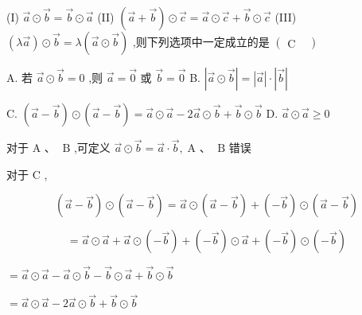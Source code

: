 \documentclass[10pt]{article}
\begin{document}
(I) \(\overrightarrow{a} \odot  \overrightarrow{b} = \overrightarrow{b} \odot  \overrightarrow{a}\) (II) \(\left( {\overrightarrow{a} + \overrightarrow{b}}\right)  \odot  \overrightarrow{c} = \overrightarrow{a} \odot  \overrightarrow{c} + \overrightarrow{b} \odot  \overrightarrow{c}\) (III) \(\left( {\lambda \overrightarrow{a}}\right)  \odot  \overrightarrow{b} = \lambda \left( {\overrightarrow{a} \odot  \overrightarrow{b}}\right)\) ,则下列选项中一定成立的是 \(\left( \begin{array}{ll} \mathrm{C} &  \end{array}\right)\)

A. 若 \(\overrightarrow{a} \odot  \overrightarrow{b} = 0\) ,则 \(\overrightarrow{a} = \overrightarrow{0}\) 或 \(\overrightarrow{b} = \overrightarrow{0}\) B. \(\left| {\overrightarrow{a} \odot  \overrightarrow{b}}\right|  = \left| \overrightarrow{a}\right|  \cdot  \left| \overrightarrow{b}\right|\)

C. \(\left( {\overrightarrow{a} - \overrightarrow{b}}\right)  \odot  \left( {\overrightarrow{a} - \overrightarrow{b}}\right)  = \overrightarrow{a} \odot  \overrightarrow{a} - 2\overrightarrow{a} \odot  \overrightarrow{b} + \overrightarrow{b} \odot  \overrightarrow{b}\) D. \(\overrightarrow{a} \odot  \overrightarrow{a} \geq  0\)

对于 \(\mathrm{A}\text{ 、 }\mathrm{\;B}\) ,可定义 \(\overrightarrow{a} \odot  \overrightarrow{b} = \overrightarrow{a} \cdot  \overrightarrow{b},\mathrm{\;A}\text{ 、 }\mathrm{\;B}\) 错误

对于 \(\mathrm{C}\) ,

\[
\left( {\overrightarrow{a} - \overrightarrow{b}}\right)  \odot  \left( {\overrightarrow{a} - \overrightarrow{b}}\right)  = \overrightarrow{a} \odot  \left( {\overrightarrow{a} - \overrightarrow{b}}\right)  + \left( {-\overrightarrow{b}}\right)  \odot  \left( {\overrightarrow{a} - \overrightarrow{b}}\right)
\]

\[
= \overrightarrow{a} \odot  \overrightarrow{a} + \overrightarrow{a} \odot  \left( {-\overrightarrow{b}}\right)  + \left( {-\overrightarrow{b}}\right)  \odot  \overrightarrow{a} + \left( {-\overrightarrow{b}}\right)  \odot  \left( {-\overrightarrow{b}}\right)
\]

\(= \overrightarrow{a} \odot  \overrightarrow{a} - \overrightarrow{a} \odot  \overrightarrow{b} - \overrightarrow{b} \odot  \overrightarrow{a} + \overrightarrow{b} \odot  \overrightarrow{b}\)

\(= \overrightarrow{a} \odot  \overrightarrow{a} - 2\overrightarrow{a} \odot  \overrightarrow{b} + \overrightarrow{b} \odot  \overrightarrow{b}\)
\end{document}
